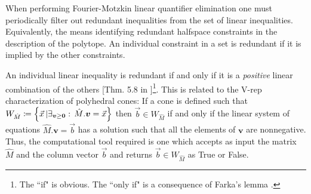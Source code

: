 When performing Fourier-Motzkin linear quantifier elimination one must periodically filter out redundant inequalities from the set of linear inequalities. Equivalently, the means identifying redundant halfspace constraints in the description of the polytope. An individual constraint in a set is redundant if it is implied by the other constraints. 

An individual linear inequality is redundant if and only if it is a \emph{positive} linear combination of the others [Thm. 5.8 in \citealp{fordan1999projection}]\footnote{The ``if" is obvious. The ``only if" is a consequence of Farka's lemma \cite{fordan1999projection}.}. This is related to the V-rep characterization of polyhedral cones: If a cone is defined such that $W_{\hat{M}}\coloneqq\left\lbrace\vec{x}\,|\exists_{\bm{v}\geq\bm{0}}:\, \hat{M}.\bm{v}=\vec{x}\right\rbrace$ then $\vec{b}\in W_{\hat{M}}$ if and only if the linear system of equations $\hat{M}.\bm{v}=\vec{b}$ has a solution such that all the elements of $\bm{v}$ are nonnegative.  Thus, the computational tool required is one which accepts as input the matrix $\hat{M}$ and the column vector $\vec{b}$ and returns $\vec{b}\in W_{\hat{M}}$ as True or False. 




